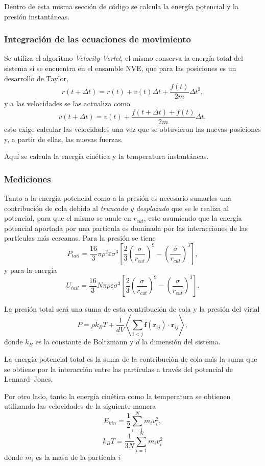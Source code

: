 \documentclass[a4paper,spanish,12pt,twoside]{article}
\begin{document}
Dentro de esta misma sección de código se calcula la energía potencial y la presión instantáneas. 

\subsubsection{Integración de las ecuaciones de movimiento}

Se utiliza el algoritmo \textit{Velocity Verlet}, el mismo conserva la energía total del sistema si se encuentra en el ensamble NVE, que para las posiciones es un desarrollo de Taylor,
$$
r(t + \Delta t) = r(t) + v(t) \Delta t + \frac{f(t)}{2m} \Delta t^2,
$$
y a las velocidades se las actualiza como
$$
v(t + \Delta t) = v(t) + \frac{f(t + \Delta t) + f(t)}{2m} \Delta t,
$$
esto exige calcular las velocidades una vez que se obtuvieron las nuevas posiciones y, a partir de ellas, las nuevas fuerzas.

Aquí se calcula la energía cinética y la temperatura instantáneas.

\subsubsection{Mediciones}

Tanto a la energía potencial como a la presión es necesario sumarles una contribución de cola debido al \textit{truncado y desplazado} que se le realiza al potencial, para que el mismo se anule en $r_{cut}$, esto asumiendo que la energía potencial aportada por una partícula es dominada por las interacciones de las partículas más cercanas. Para la presión se tiene
$$
P_{tail} = \frac{16}{3}\pi\rho^2\varepsilon\sigma^3 \left[ \frac{2}{3}\left( \frac{\sigma}{r_{cut}} \right)^9 - \left( \frac{\sigma}{r_{cut}} \right)^3 \right],
$$
y para la energía
$$
U_{tail} = \frac{16}{3}N\pi\rho\varepsilon\sigma^3 \left[ \frac{2}{3}\left( \frac{\sigma}{r_{cut}} \right)^9 - \left( \frac{\sigma}{r_{cut}} \right)^3 \right].
$$

La presión total será una suma de esta contribución de cola y la presión del virial
$$
P = \rho k_BT + \frac{1}{dV} \left\langle \sum_{i<j} \mathbf{f}(\mathbf{r}_{ij}) \cdot \mathbf{r}_{ij} \right\rangle,
$$
donde $k_B$ es la constante de Boltzmann y $d$ la dimensión del sistema.

La energía potencial total es la suma de la contribución de cola más la suma que se obtiene por la interacción entre las partículas a través del potencial de Lennard--Jones.

Por otro lado, tanto la energía cinética como la temperatura se obtienen utilizando las velocidades de la siguiente manera
$$
E_{kin} = \frac{1}{2} \sum_{i=1}^N m_i v_i^2,
$$
$$
k_BT = \frac{1}{3N} \sum_{i=1}^{N} m_i v_i^2
$$
donde $m_i$ es la masa de la partícula $i$
\end{document}
